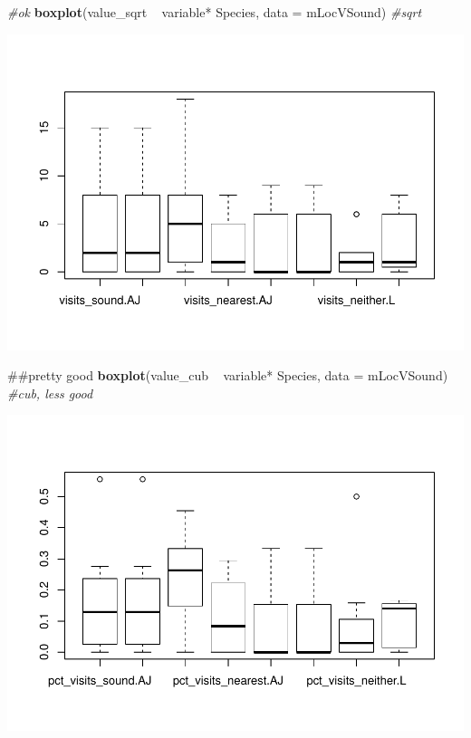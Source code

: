 \documentclass[]{article}
\newenvironment{Shaded}{\begin{snugshade}}{\end{snugshade}}
\newcommand{\KeywordTok}[1]{\textcolor[rgb]{0.13,0.29,0.53}{\textbf{{#1}}}}
\newcommand{\DataTypeTok}[1]{\textcolor[rgb]{0.13,0.29,0.53}{{#1}}}
\newcommand{\StringTok}[1]{\textcolor[rgb]{0.31,0.60,0.02}{{#1}}}
\newcommand{\CommentTok}[1]{\textcolor[rgb]{0.56,0.35,0.01}{\textit{{#1}}}}
\newcommand{\NormalTok}[1]{{#1}}
\begin{document}
\begin{Shaded}
\begin{Highlighting}[]
\CommentTok{#ok}
\KeywordTok{boxplot}\NormalTok{(value_sqrt ~}\StringTok{  }\NormalTok{variable*}\StringTok{ }\NormalTok{Species, }\DataTypeTok{data =} \NormalTok{mLocVSound) }\CommentTok{#sqrt}
\end{Highlighting}
\end{Shaded}

\includegraphics{Sensory_learning_files/figure-latex/unnamed-chunk-17-2.pdf}

\begin{Shaded}
\begin{Highlighting}[]
\NormalTok{##pretty good}
\KeywordTok{boxplot}\NormalTok{(value_cub ~}\StringTok{  }\NormalTok{variable*}\StringTok{ }\NormalTok{Species, }\DataTypeTok{data =} \NormalTok{mLocVSound) }\CommentTok{#cub, less good}
\end{Highlighting}
\end{Shaded}

\includegraphics{Sensory_learning_files/figure-latex/unnamed-chunk-17-3.pdf}
\end{document}
